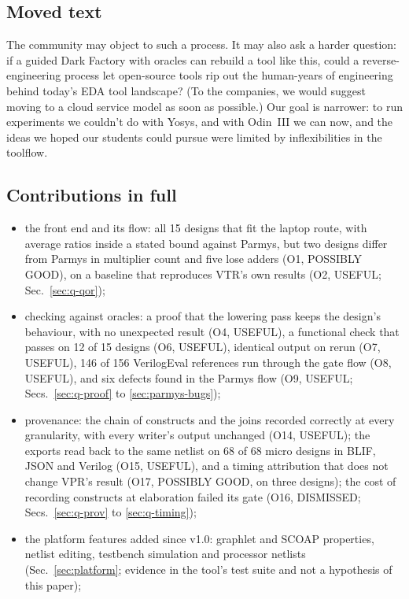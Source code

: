 \documentclass[conference]{IEEEtran}
\begin{document}
\subsection{Moved text}

The community may object to such a process. It may also ask a harder question: if a guided Dark Factory with oracles can rebuild a tool like this, could a reverse-engineering process let open-source tools rip out the human-years of engineering behind today's EDA tool landscape? (To the companies, we would suggest moving to a cloud service model as soon as possible.) Our goal is narrower: to run experiments we couldn't do with Yosys, and with Odin~III we can now, and the ideas we hoped our students could pursue were limited by inflexibilities in the toolflow.

\subsection{Contributions in full}

\begin{itemize}
\item the front end and its flow: all 15 designs that fit the laptop route, with average ratios inside a stated bound against Parmys, but two designs differ from Parmys in multiplier count and five lose adders (O1, POSSIBLY GOOD), on a baseline that reproduces VTR's own results (O2, USEFUL; Sec.~\ref{sec:q-qor});
\item checking against oracles: a proof that the lowering pass keeps the design's behaviour, with no unexpected result (O4, USEFUL), a functional check that passes on 12 of 15 designs (O6, USEFUL), identical output on rerun (O7, USEFUL), 146 of 156 VerilogEval references run through the gate flow (O8, USEFUL), and six defects found in the Parmys flow (O9, USEFUL; Secs.~\ref{sec:q-proof} to \ref{sec:parmys-bugs});
\item provenance: the chain of constructs and the joins recorded correctly at every granularity, with every writer's output unchanged (O14, USEFUL); the exports read back to the same netlist on 68 of 68 micro designs in BLIF, JSON and Verilog (O15, USEFUL), and a timing attribution that does not change VPR's result (O17, POSSIBLY GOOD, on three designs); the cost of recording constructs at elaboration failed its gate (O16, DISMISSED; Secs.~\ref{sec:q-prov} to \ref{sec:q-timing});
\item the platform features added since v1.0: graphlet and SCOAP properties, netlist editing, testbench simulation and processor netlists (Sec.~\ref{sec:platform}; evidence in the tool's test suite and not a hypothesis of this paper);
\end{itemize}
\end{document}
